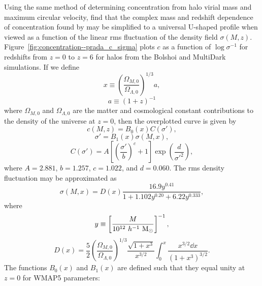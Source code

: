 Using the same method of determining concentration from halo virial mass and maximum circular velocity, \citet{2012MNRAS.423.3018P} find that the complex mass and redshift dependence of concentration found by \citet{2011ApJ...740..102K} may be simplified to a universal U-shaped profile when viewed as a function of the linear rms fluctuation of the density field $\sigma(M,z)$.  Figure~\ref{fig:concentration--prada_c_sigma} plots $c$ as a function of $\log \sigma^{-1}$ for redshifts from $z = 0$ to $z = 6$ for halos from the Bolshoi \citep{2011ApJ...740..102K} and MultiDark \citep{2012MNRAS.423.3018P} simulations.  If we define
\begin{equation}
	x \equiv \left( \frac{\Omega_{M,0}}{\Omega_{\Lambda,0}} \right)^{1/3} a,
\end{equation}
\begin{equation}
	a \equiv (1 + z)^{-1}
\end{equation}
where $\Omega_{M,0}$ and $\Omega_{\Lambda,0}$ are the matter and cosmological constant contributions to the density of the universe at $z = 0$, then the overplotted curve is given by
\begin{equation} \label{eq:prada_universal_sigma}
	c(M,z) = B_{0}(x)C(\sigma'),
\end{equation}
\begin{equation}
	\sigma' = B_{1}(x) \sigma(M,x),
\end{equation}
\begin{equation} \label{eq:prada_universal_sigma_scaled}
	C(\sigma') = A \left[ \left( \frac{\sigma'}{b} \right)^{c} + 1 \right] \exp\left( \frac{d}{\sigma'^{2}} \right),
\end{equation}
where $A = 2.881$, $b = 1.257$, $c = 1.022$, and $d = 0.060$.  The rms density fluctuation may be approximated as
\begin{equation}
	\sigma(M,x) = D(x) \frac{16.9 y^{0.41}}{1 + 1.102 y^{0.20} + 6.22 y^{0.333}},
\end{equation}
where
\begin{equation}
	y \equiv \left[ \frac{M}{10^{12}\ h^{-1}\ \Msun} \right]^{-1},
\end{equation}
\begin{equation}
	D(x) = \frac{5}{2} \left( \frac{\Omega_{M,0}}{\Omega_{\Lambda,0}} \right)^{1/3} \frac{\sqrt{1 + x^{3}}}{x^{3/2}} \int_{0}^{x} \frac{x^{3/2} \dd x}{(1 + x^{3})^{3/2}}.
\end{equation}
The functions $B_{0}(x)$ and $B_{1}(x)$ are defined such that they equal unity at $z = 0$ for WMAP5 parameters:

